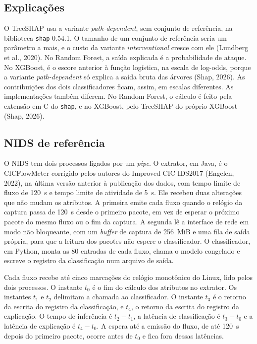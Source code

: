 \documentclass[
  article,
  12pt,
  oneside,
  a4paper,
  english,
  brazil
]{abntex2}
\begin{document}
\subsection{Explicações}

O TreeSHAP usa a variante \emph{path-dependent}, sem conjunto de referência, na biblioteca
\texttt{shap} 0.54.1. O tamanho de um conjunto de referência seria um parâmetro a mais, e o custo da
variante \emph{interventional} cresce com ele (Lundberg et al., 2020). No Random Forest, a saída
explicada é a probabilidade de ataque. No XGBoost, é o escore anterior à função logística, na escala
de log-odds, porque a variante \emph{path-dependent} só explica a saída bruta das árvores (Shap, 2026). As
contribuições dos dois classificadores ficam, assim, em escalas diferentes. As implementações
também diferem. No Random Forest, o cálculo é feito pela extensão em C do \texttt{shap}, e no
XGBoost, pelo TreeSHAP do próprio XGBoost (Shap, 2026).

\subsection{NIDS de referência}

O NIDS tem dois processos ligados por um \emph{pipe}. O extrator, em Java, é o CICFlowMeter
corrigido pelos autores do Improved CIC-IDS2017 (Engelen, 2022), na última versão anterior à publicação dos dados,
com tempo limite de fluxo de 120~s e tempo limite de atividade de 5~s. Ele recebeu duas alterações que não mudam os
atributos. A primeira emite cada fluxo quando o relógio da captura passa de 120~s desde o primeiro
pacote, em vez de esperar o próximo pacote do mesmo fluxo ou o fim da captura. A segunda lê a
interface de rede em modo não bloqueante, com um \emph{buffer} de captura de 256~MiB e uma fila de
saída própria, para que a leitura dos pacotes não espere o classificador. O classificador, em
Python, monta as 80 entradas de cada fluxo, chama o modelo congelado e escreve o registro da
classificação num arquivo de saída.

Cada fluxo recebe até cinco marcações do relógio monotônico do Linux, lido pelos dois processos.
O instante $t_0$ é o fim do cálculo dos atributos no extrator. Os instantes $t_1$ e $t_2$ delimitam
a chamada ao classificador. O instante $t_3$ é o retorno da escrita do registro da classificação, e
$t_4$, o retorno da escrita do registro da explicação. O tempo de inferência é $t_2 - t_1$, a
latência de classificação é $t_3 - t_0$ e a latência de explicação é $t_4 - t_0$. A espera até a
emissão do fluxo, de até 120~s depois do primeiro pacote, ocorre antes de $t_0$ e fica fora dessas
latências.
\end{document}
